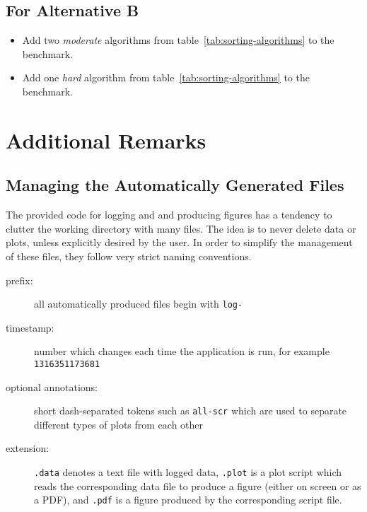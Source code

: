 \documentclass[a4paper,10pt]{article}
\begin{document}
\subsection*{For Alternative B}

\begin{itemize}

\item
  Add two \emph{moderate} algorithms from table~\ref{tab:sorting-algorithms} to the benchmark.

\item
  Add one \emph{hard} algorithm from table~\ref{tab:sorting-algorithms} to the benchmark.
  
\end{itemize}



\section{Additional Remarks}\label{sec:remarks}



\subsection{Managing the Automatically Generated Files}

The provided code for logging and and producing figures has a tendency to clutter the working directory with many files.
The idea is to never delete data or plots, unless explicitly desired by the user.
In order to simplify the management of these files, they follow very strict naming conventions.

\begin{description}
\item[prefix:]
  all automatically produced files begin with \texttt{log-}
\item[timestamp:]
  number which changes each time the application is run, for example \texttt{1316351173681}
\item[optional annotations:]
  short dash-separated tokens such as \texttt{all-scr} which are used to separate different types of plots from each other
\item[extension:]
  \texttt{.data} denotes a text file with logged data, \texttt{.plot} is a plot script which reads the corresponding data file to produce a figure (either on screen or as a PDF), and \texttt{.pdf} is a figure produced by the corresponding script file.
\end{description}
\end{document}
